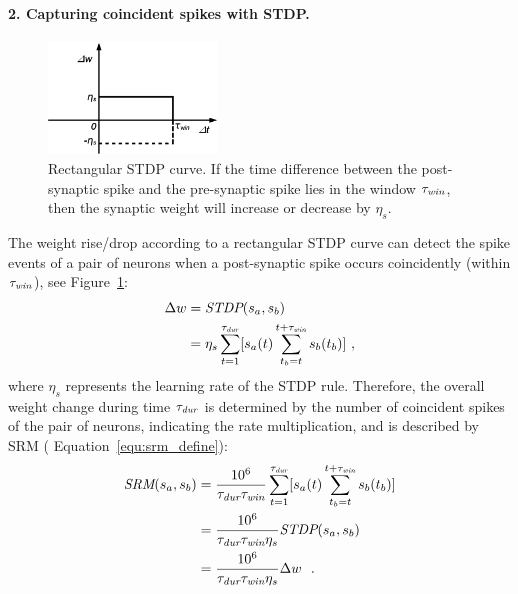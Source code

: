 \paragraph{2. Capturing coincident spikes with STDP.\\}
\begin{figure}
	\centering
	\includegraphics[width=0.4\textwidth]{pics_sdlm/stdp.png}
	\caption[Rectangular STDP curve.]{Rectangular STDP curve.
		If the time difference between the post-synaptic spike and the pre-synaptic spike lies in the window $\tau_{\textit{\textrm{win}}}$, then the synaptic weight will increase or decrease by $\eta_s$.}
	\label{fig:rtg_stdp}
\end{figure}
The weight rise/drop according to a rectangular STDP curve can detect the spike events of a pair of neurons when a post-synaptic spike occurs coincidently (within $\tau_{\textit{\textrm{win}}}$), see Figure~\ref{fig:rtg_stdp}:
\begin{equation}
\begin{aligned}
\Delta w &= \textit{\textrm{STDP}}(s_a, s_b)\\
&= \eta_s \sum_{t=1}^{\tau_{\textit{\textrm{dur}}}} [s_a(t) \sum_{t_b=t}^{t+\tau_{\textit{\textrm{win}}}} s_b(t_b)]~,
\end{aligned}
\end{equation}
where $ \eta_s$ represents the learning rate of the STDP rule.
Therefore, the overall weight change during time $\tau_{\textit{\textrm{dur}}}$ is determined by the number of coincident spikes of the pair of neurons, indicating the rate multiplication, and is described by SRM ( Equation~\ref{equ:srm_define}):
\begin{equation}
\begin{aligned}
\textit{\textrm{SRM}}(s_a, s_b) %
&= \frac{10^6}{\tau_{\textit{\textrm{dur}}} \tau_{\textit{\textrm{win}}}} \sum_{t=1}^{\tau_{\textit{\textrm{dur}}}} [s_a(t) \sum_{t_b=t}^{t+\tau_{\textit{\textrm{win}}}} s_b(t_b)]\\
&= \frac{10^6}{\tau_{\textit{\textrm{dur}}}
	\tau_{\textit{\textrm{win}}}
	\eta_s}
\textit{\textrm{STDP}}(s_a, s_b)\\  %
&= \frac{10^6}{\tau_{\textit{\textrm{dur}}}
	\tau_{\textit{\textrm{win}}}
	\eta_s}
\Delta w~~.
\end{aligned}
\end{equation}
